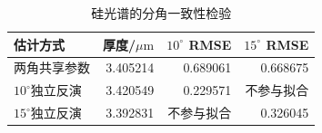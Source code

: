 \begin{table}[htbp]
\centering
\small
\caption{硅光谱的分角一致性检验}
\label{tab:silicon-angles}
\begin{tabular}{lrrr}
\toprule
估计方式 & 厚度/$\mu\mathrm m$ & $10^\circ$ RMSE & $15^\circ$ RMSE\\
\midrule
两角共享参数 & 3.405214 & 0.689061 & 0.668675\\
$10^\circ$独立反演 & 3.420549 & 0.229571 & 不参与拟合\\
$15^\circ$独立反演 & 3.392831 & 不参与拟合 & 0.326045\\
\bottomrule
\end{tabular}
\end{table}
